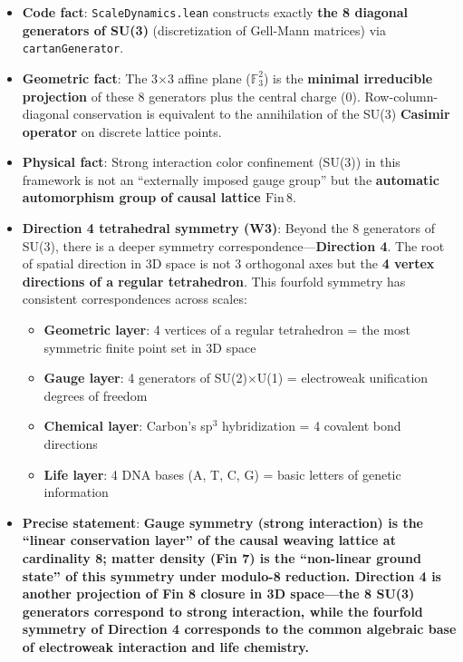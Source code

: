 \documentclass[aps,prd,twocolumn,nofootinbib,floatfix]{revtex4-2}
\begin{document}
\begin{itemize}
    \item \textbf{Code fact}: \texttt{ScaleDynamics.lean} constructs exactly \textbf{the 8 diagonal generators of SU(3)} (discretization of Gell-Mann matrices) via \texttt{cartanGenerator}.
    \item \textbf{Geometric fact}: The 3$\times$3 affine plane ($\mathbb{F}_3^2$) is the \textbf{minimal irreducible projection} of these 8 generators plus the central charge (0). Row-column-diagonal conservation is equivalent to the annihilation of the SU(3) \textbf{Casimir operator} on discrete lattice points.
    \item \textbf{Physical fact}: Strong interaction color confinement (SU(3)) in this framework is not an ``externally imposed gauge group'' but the \textbf{automatic automorphism group of causal lattice $\text{Fin}\,8$}.
    \item \textbf{Direction 4 tetrahedral symmetry (W3)}: Beyond the 8 generators of SU(3), there is a deeper symmetry correspondence---\textbf{Direction 4}. The root of spatial direction in 3D space is not 3 orthogonal axes but the \textbf{4 vertex directions of a regular tetrahedron}. This fourfold symmetry has consistent correspondences across scales:
    \begin{itemize}
        \item \textbf{Geometric layer}: 4 vertices of a regular tetrahedron = the most symmetric finite point set in 3D space
        \item \textbf{Gauge layer}: 4 generators of SU(2)$\times$U(1) = electroweak unification degrees of freedom
        \item \textbf{Chemical layer}: Carbon's sp$^3$ hybridization = 4 covalent bond directions
        \item \textbf{Life layer}: 4 DNA bases (A, T, C, G) = basic letters of genetic information
    \end{itemize}
    \item \textbf{Precise statement}: \textbf{Gauge symmetry (strong interaction) is the ``linear conservation layer'' of the causal weaving lattice at cardinality 8; matter density (Fin 7) is the ``non-linear ground state'' of this symmetry under modulo-8 reduction. Direction 4 is another projection of Fin 8 closure in 3D space---the 8 SU(3) generators correspond to strong interaction, while the fourfold symmetry of Direction 4 corresponds to the common algebraic base of electroweak interaction and life chemistry.}
\end{itemize}
\end{document}
